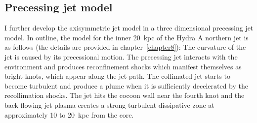 
\subsection{Precessing jet model}
I further develop the axisymmetric jet model in a three dimensional precessing jet model. In outline, the model for the inner 20~kpc of the Hydra A northern jet is as follows (the details are provided in chapter~\ref{chapter8}): The curvature of the jet is caused by its precessional motion. The precessing jet interacts with the environment and produces reconfinement shocks which manifest themselves as bright knots, which appear along the jet path. The collimated jet starts to become turbulent and produce a plume when it is sufficiently decelerated by the recollimation shocks. The jet hits the cocoon wall near the fourth knot and the back flowing jet plasma creates a strong turbulent dissipative zone at approximately 10 to 20~kpc from the core. 

 


